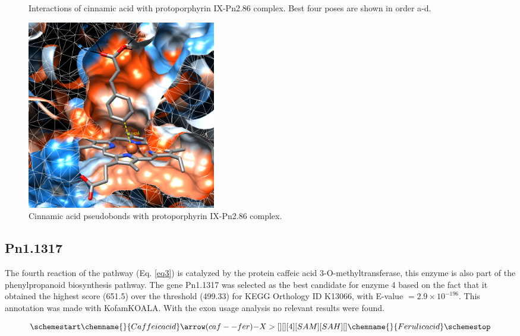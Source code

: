 \documentclass[12pt]{article}
\begin{document}
\begin{figure}[h!]
\begin{subfigure}[h!]{0.35\textwidth}
			\caption{}
		\end{subfigure}
		\hfill
		\caption[Interactions between cinnamic acid and protoporphyrin IX-Pn2.86 complex.]{Interactions of cinnamic acid with protoporphyrin IX-Pn2.86 complex. Best four poses are shown in order a-d.}
		\label{fig2_5}
	\end{figure}
	\FloatBarrier
	
	\FloatBarrier
	\begin{figure}[h!]
		\centering
		\includegraphics[width=0.4\textwidth]{../2/Dock/Dock2/chimera.png}
		\caption{Cinnamic acid pseudobonds with protoporphyrin IX-Pn2.86 complex.}
		\label{fig2_6}
	\end{figure}
	\FloatBarrier
	
	\subsection{Pn1.1317}
	
	The fourth reaction of the pathway (Eq. \ref{eq3}) is catalyzed by the protein caffeic acid 3-O-methyltransferase, this enzyme is also part of the phenylpropanoid biosynthesis pathway. The gene Pn1.1317 was selected as the best candidate for enzyme 4 based on the fact that it obtained the highest score (651.5) over the threshold (499.33) for KEGG Orthology ID K13066, with E-value $=2.9\times10^{-196}$. This annotation was made with KofamKOALA. \cite{kofamkoala} With the exon usage analysis no relevant results were found.
	
	\begin{equation}
	\schemestart
	\label{eq3}
	\chemname{\footnotesize}{Caffeic acid}\arrow(caf--fer){-X>[][][4][SAM][SAH][]}\chemname{\footnotesize}{Ferulic acid}
	\schemestop
	\end{equation}\\
	
\end{document}
